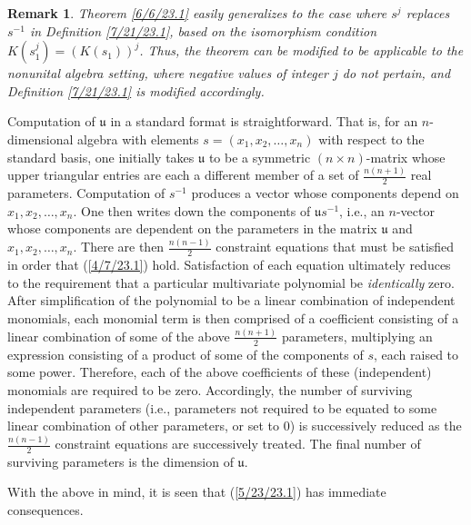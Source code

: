 \documentclass{amsart}
\numberwithin{equation}{section}
\newtheorem{remark}[theorem]{Remark}
\theoremstyle{definition}
\numberwithin{theorem}{section}
\begin{document}
\begin{remark} \label{9/18/23.1} {\rm Theorem \ref{6/6/23.1} easily generalizes to the case where $s^j$ replaces $s^{-1}$ in Definition \ref{7/21/23.1}, based on the isomorphism condition $K(s_1^j) = (K(s_1))^j$. Thus, the theorem can be modified to be applicable to the nonunital algebra setting, where negative values of integer $j$ do not pertain, and Definition \ref{7/21/23.1} is modified accordingly.  } \end{remark}

Computation of $\mathfrak{u}$ in a standard format is straightforward.  That is, for an $n$-dimensional algebra with elements $s = (x_1,x_2,\dots,x_n)$ with respect to the standard basis, one initially takes $\mathfrak{u}$ to be a symmetric $(n\times n)$-matrix  whose upper triangular entries are each a different member of a set of $\frac{n(n+1)}{2}$ real parameters.  Computation of $s^{-1}$ produces a vector whose components depend on $x_1,x_2,\dots,x_n$.  One then writes down the components of $\mathfrak{u}s^{-1}$, i.e., an $n$-vector whose components are dependent on the parameters in the matrix $\mathfrak{u}$ and $x_1,x_2,\dots,x_n$.  There are then $\frac{n(n-1)}{2}$ constraint equations that must be satisfied in order that (\ref{4/7/23.1}) hold.  Satisfaction of each equation ultimately reduces to the requirement that a particular multivariate polynomial be {\it identically} zero.  After simplification of the polynomial to be a linear combination of independent monomials, each monomial term is then comprised of a coefficient consisting of a linear combination of some of the above $\frac{n(n+1)}{2}$ parameters, multiplying an expression consisting of a product of some of the components of $s$, each raised to some power.  Therefore, each of the above coefficients of these (independent) monomials are required to be zero.  Accordingly, the number of surviving independent parameters (i.e., parameters not required to be equated to some linear combination of other parameters, or set to 0) is successively reduced as the $\frac{n(n-1)}{2}$ constraint equations are successively treated.  The final number of surviving parameters is the dimension of $\mathfrak{u}$.

   With the above in mind, it is seen that (\ref{5/23/23.1}) has immediate consequences.
    
\end{document}
